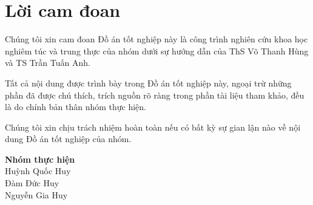 \section*{Lời cam đoan}
\thispagestyle{empty}

Chúng tôi xin cam đoan Đồ án tốt nghiệp này là công trình nghiên cứu khoa học nghiêm túc và trung thực của nhóm dưới sự hướng dẫn của ThS Võ Thanh Hùng và TS Trần Tuấn Anh.

Tất cả nội dung được trình bày trong Đồ án tốt nghiệp này, ngoại trừ những phần đã được chú thích, trích nguồn rõ ràng trong phần tài liệu tham khảo, đều là do chính bản thân nhóm thực hiện.

Chúng tôi xin chịu trách nhiệm hoàn toàn nếu có bất kỳ sự gian lận nào về nội dung Đồ án tốt nghiệp của nhóm.

\vspace{2cm} %

\begin{flushright}
    \textbf{Nhóm thực hiện} \\[0.5cm] %
    
    Huỳnh Quốc Huy \\[0.2cm]
    
    Đàm Đức Huy \\[0.2cm]
    
    Nguyễn Gia Huy
\end{flushright}

\clearpage
{}
